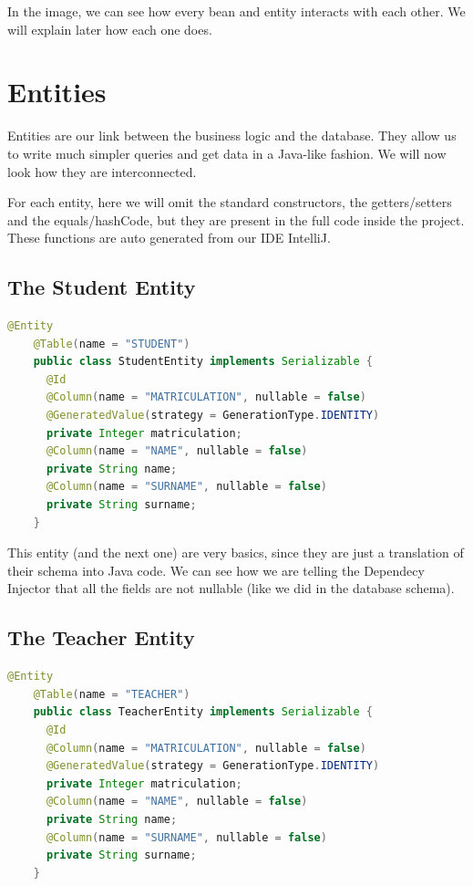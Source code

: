 \documentclass[12pt, a4paper]{article}
\begin{document}
  In the image, we can see how every bean and entity interacts with each other. We will explain later how each one does.

  \pagebreak
  \section{Entities}

  Entities are our link between the business logic and the database. They allow us to write much simpler queries and get data in a Java-like fashion. We will now look how they are interconnected.

  For each entity, here we will omit the standard constructors, the getters/setters and the equals/hashCode, but they are present in the full code inside the project. These functions are auto generated from our IDE IntelliJ.

  \subsection{The Student Entity}
  \begin{lstlisting}[language=java, caption={The Student Entity}]
    @Entity
    @Table(name = "STUDENT")
    public class StudentEntity implements Serializable {
      @Id
      @Column(name = "MATRICULATION", nullable = false)
      @GeneratedValue(strategy = GenerationType.IDENTITY)
      private Integer matriculation;
      @Column(name = "NAME", nullable = false)
      private String name;
      @Column(name = "SURNAME", nullable = false)
      private String surname;
    }
  \end{lstlisting}

  This entity (and the next one) are very basics, since they are just a translation of their schema into Java code. We can see how we are telling the Dependecy Injector that all the fields are not nullable (like we did in the database schema).

  \subsection{The Teacher Entity}
  \begin{lstlisting}[language=java, caption={The Teacher Entity}]
    @Entity
    @Table(name = "TEACHER")
    public class TeacherEntity implements Serializable {
      @Id
      @Column(name = "MATRICULATION", nullable = false)
      @GeneratedValue(strategy = GenerationType.IDENTITY)
      private Integer matriculation;
      @Column(name = "NAME", nullable = false)
      private String name;
      @Column(name = "SURNAME", nullable = false)
      private String surname;
    }
  \end{lstlisting}
\end{document}
